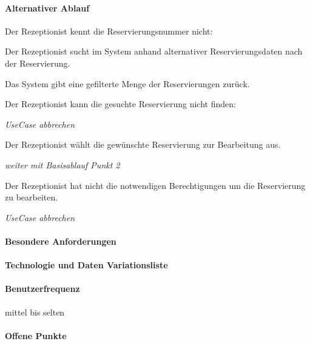 \paragraph{Alternativer Ablauf}
\begin{longenum}
	\item
	\begin{longenum}
		\item Der Rezeptionist kennt die \Gls{Reservierungsnummer} nicht:
		\begin{longenum}
			\item Der \Gls{Rezeptionist} sucht im System anhand alternativer Reservierungsdaten nach der \Gls{Reservierung}.
			\item Das System gibt eine gefilterte Menge der \Gls{Reservierung}en zurück.
			\begin{longenum}
				\item Der \Gls{Rezeptionist} kann die gesuchte Reservierung nicht finden:
				\begin{longenum}
					\item \emph{UseCase abbrechen}
				\end{longenum}
			\end{longenum}
			\item Der \Gls{Rezeptionist} wählt die gewünschte Reservierung zur Bearbeitung aus.
			\item \emph{weiter mit Basisablauf Punkt 2}
		\end{longenum}
	\end{longenum}
	\item
	\item
	\begin{longenum}
		\item Der \Gls{Rezeptionist} hat nicht die notwendigen Berechtigungen um die Reservierung zu bearbeiten.
		\begin{longenum}
			\item \emph{UseCase abbrechen}
		\end{longenum}
	\end{longenum}
	\item
\end{longenum}

\paragraph{Besondere Anforderungen}

\paragraph{Technologie und Daten Variationsliste}

\paragraph{Benutzerfrequenz}
mittel bis selten

\paragraph{Offene Punkte}

\newpage

